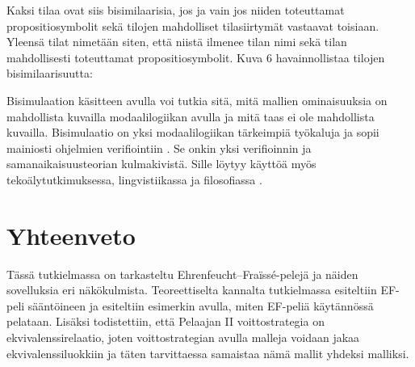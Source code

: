 \documentclass[finnish]{tktltiki2}
\theoremstyle{definition}
\theoremstyle{remark}
\begin{document}
Kaksi tilaa ovat siis bisimilaarisia, jos ja vain jos niiden toteuttamat propositiosymbolit sekä tilojen mahdolliset tilasiirtymät vastaavat toisiaan. Yleensä tilat nimetään siten, että niistä ilmenee tilan nimi sekä tilan mahdollisesti toteuttamat propositiosymbolit. Kuva 6 havainnollistaa tilojen bisimilaarisuutta:

\begin{center}
\end{center}

Bisimulaation käsitteen avulla voi tutkia sitä, mitä mallien ominaisuuksia on mahdollista kuvailla modaalilogiikan avulla ja mitä taas ei ole mahdollista kuvailla. Bisimulaatio on yksi modaalilogiikan tärkeimpiä työkaluja ja sopii mainiosti ohjelmien verifiointiin \cite{Bla01}. Se onkin yksi verifioinnin ja samanaikaisuusteorian kulmakivistä. Sille löytyy käyttöä myös tekoälytutkimuksessa, lingvistiikassa ja filosofiassa \cite{Bla06}.

\section{Yhteenveto}
Tässä tutkielmassa on tarkasteltu Ehrenfeucht--Fraïssé-pelejä ja näiden sovelluksia eri näkökulmista. Teoreettiselta kannalta tutkielmassa esiteltiin EF-peli sääntöineen ja esiteltiin esimerkin avulla, miten EF-peliä käytännössä pelataan. Lisäksi todistettiin, että Pelaajan II voittostrategia on ekvivalenssirelaatio, joten voittostrategian avulla malleja voidaan jakaa ekvivalenssiluokkiin ja täten tarvittaessa samaistaa nämä mallit yhdeksi malliksi.
\end{document}
